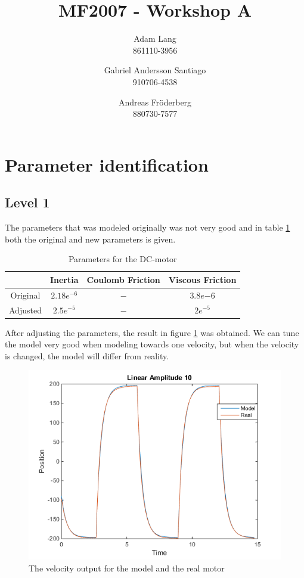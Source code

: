 \documentclass[12pt,a4paper]{article}
\title{MF2007 - Workshop A}
\author{
Adam Lang \\ 861110-3956
\and
Gabriel Andersson Santiago \\ 910706-4538
\and 
Andreas Fr\"oderberg \\ 880730-7577
}
\begin{document}
\maketitle

\section*{Parameter identification}

\subsection*{Level 1}
The parameters that was modeled originally was not very good and in
table \ref{tab:parameters} both the original and new parameters is
given.
\begin{center}
  \begin{table}[H]
    \caption{Parameters for the DC-motor}
    \begin{tabular}{|c|c|c|c|}
        \hline
        & Inertia & Coulomb Friction & Viscous Friction \\ 
        \hline
        Original & $2.18e^{-6}$ & $-$ & $3.8e{-6}$ \\
        \hline
        Adjusted & $2.5e^{-5}$ & $-$ & $2e^{-5}$ \\
        \hline
    \end{tabular}
   \label{tab:parameters}
  \end{table}
\end{center}
After adjusting the parameters, the result in figure
\ref{fig:par_level1} was obtained. We can
tune the model very good when modeling towards one velocity, but when
the velocity is changed, the model will differ from reality.
\begin{center}
    \begin{figure}[H]
    \centering
      \includegraphics[scale = 0.6]{par_level1.png}
      \caption{The velocity output for the model and the real motor}
      \label{fig:par_level1}
    \end{figure}
\end{center}
\end{document}
